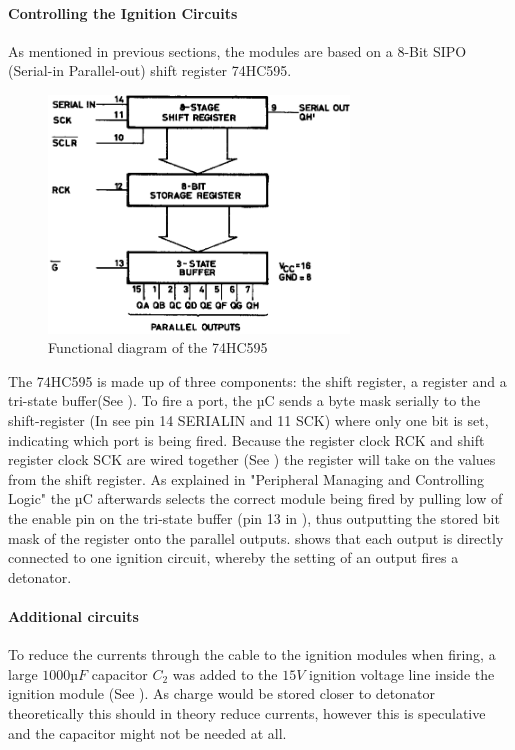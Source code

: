 \pagebreak

\paragraph{Controlling the Ignition Circuits}
As mentioned in previous sections, the modules are based on a 8-Bit SIPO (Serial-in Parallel-out) shift register 74HC595. 

\begin{figure}[!ht]
    \centering
    \includegraphics[width=8cm]{./Figures/75hc595_functional.png}
    \caption{Functional diagram of the 74HC595}
    \label{fig:75hc595}     
\end{figure}


\noindent The 74HC595 is made up of three components: the shift register, a register and a tri-state buffer(See ). To fire a port, the µC sends a byte mask serially to the shift-register (In  see pin 14 SERIALIN and 11 SCK) where only one bit is set, indicating which port is being fired. Because the register clock RCK and shift register clock SCK are wired together (See ) the register will take on the values from the shift register. As explained in  "Peripheral Managing and Controlling Logic" the µC afterwards selects the correct module being fired by pulling low of the enable pin on the tri-state buffer (pin 13 in ), thus outputting the stored bit mask of the register onto the parallel outputs.  shows that each output is directly connected to one ignition circuit, whereby the setting of an output fires a detonator.\\

\paragraph{Additional circuits}
To reduce the currents through the cable to the ignition modules when firing, a large $1000µF$ capacitor $C_2$ was added to the $15V$ ignition voltage line inside the ignition module (See ). As charge would be stored closer to detonator theoretically this should in theory reduce currents, however this is speculative and the capacitor might not be needed at all.\\


